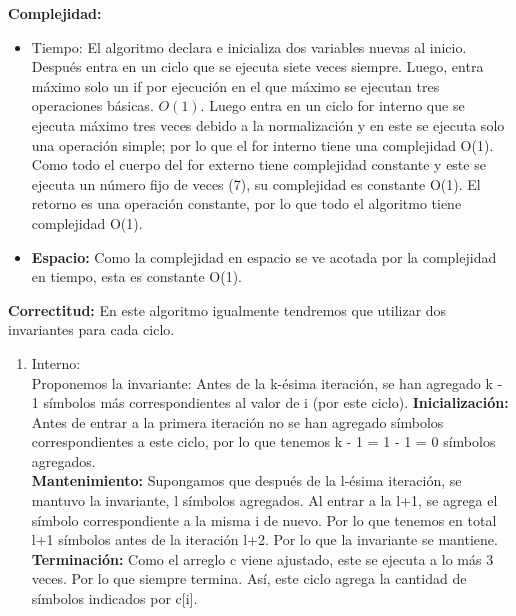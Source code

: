 \documentclass[12pt]{article}
\begin{document}
\begin{itemize}
\begin{algorithm}[H]
{{        
    }
}
\end{algorithm}

    \textbf{Complejidad:}
    \begin{itemize}
        \item Tiempo: El algoritmo declara e inicializa dos variables nuevas al inicio. Después  entra en un ciclo que se ejecuta siete veces siempre. Luego, entra máximo solo un if por ejecución en el que máximo se ejecutan tres operaciones básicas. $O(1)$. Luego entra en un ciclo for interno que se ejecuta máximo tres veces debido a la normalización y en este se ejecuta solo una operación simple; por lo que el for interno tiene una complejidad O(1). Como todo el cuerpo del for externo tiene complejidad constante y este se ejecuta un número fijo de veces (7), su complejidad es constante O(1). El retorno es una operación constante, por lo que todo el algoritmo tiene complejidad O(1).
        \item \textbf{Espacio:} Como la complejidad en espacio se ve acotada por la complejidad en tiempo, esta es constante O(1).
    \end{itemize}
    \textbf{Correctitud:} En este algoritmo igualmente tendremos que
    utilizar dos invariantes para cada ciclo.\\
    \begin{enumerate}
        \item Interno:\\
        Proponemos la invariante: Antes de la k-ésima iteración, se han agregado k - 1 símbolos más correspondientes al valor de i (por este ciclo).
        \textbf{Inicialización:} Antes de entrar a la primera iteración no se han agregado símbolos correspondientes a este ciclo, por lo que tenemos k - 1 = 1 - 1 = 0 símbolos agregados.\\
        \textbf{Mantenimiento:}
        Supongamos que después de la l-ésima iteración, se mantuvo la invariante, l símbolos agregados. Al entrar a la l+1, se agrega el símbolo correspondiente a la misma i de nuevo. Por lo que tenemos en total l+1 símbolos antes de la iteración l+2. Por lo que la invariante se mantiene.\\
        \textbf{Terminación:} Como el arreglo c viene ajustado, este se ejecuta a lo más 3 veces. Por lo que siempre termina. Así, este ciclo agrega la cantidad de símbolos indicados por c[i].


\end{enumerate}
\end{itemize}
\end{document}
